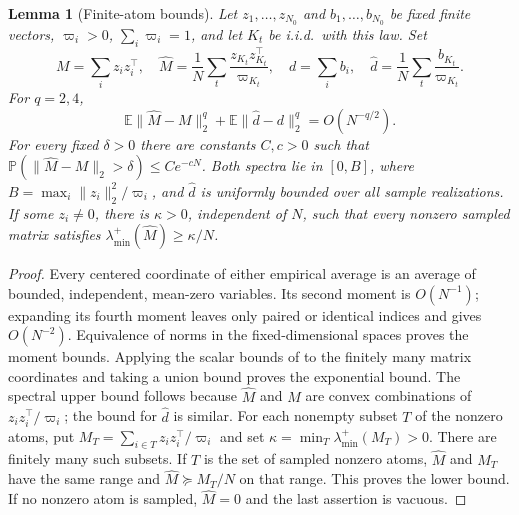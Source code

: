 \documentclass[11pt,a4paper,leqno]{article}
\numberwithin{equation}{section}
\numberwithin{figure}{section}
\numberwithin{table}{section}
\theoremstyle{plain}
\newtheorem{lemma}{Lemma}[section]
\theoremstyle{definition}
\theoremstyle{remark}
\newcommand{\E}{\mathbb E}
\newcommand{\Prob}{\mathbb P}
\begin{document}
\begin{lemma}[Finite-atom bounds]\label{lem:finite_atoms}
Let $z_1,\ldots,z_{N_0}$ and $b_1,\ldots,b_{N_0}$ be fixed finite vectors,
$\varpi_i>0$, $\sum_i\varpi_i=1$, and let $K_t$ be i.i.d.\ with this law.
Set
\[
 M=\sum_i z_i z_i^\top,\quad
 \widehat M=\frac1N\sum_t\frac{z_{K_t}z_{K_t}^\top}{\varpi_{K_t}},
 \quad d=\sum_i b_i,\quad
 \widehat d=\frac1N\sum_t\frac{b_{K_t}}{\varpi_{K_t}}.
\]
For $q=2,4$,
\[
 \E\|\widehat M-M\|_2^q+\E\|\widehat d-d\|_2^q=O(N^{-q/2}).
\]
For every fixed $\delta>0$ there are constants $C,c>0$ such that
$\Prob(\|\widehat M-M\|_2>\delta)\le Ce^{-cN}$.
Both spectra lie in $[0,B]$, where $B=\max_i\|z_i\|_2^2/\varpi_i$,
and $\widehat d$ is uniformly bounded over all sample realizations.
If some $z_i\ne0$, there is $\kappa>0$, independent of $N$, such that
every nonzero sampled matrix satisfies
$\lambda_{\min}^+(\widehat M)\ge\kappa/N$.
\end{lemma}
\begin{proof}
Every centered coordinate of either empirical average is an average of
bounded, independent, mean-zero variables. Its second moment is $O(N^{-1})$;
expanding its fourth moment leaves only paired or identical indices and
gives $O(N^{-2})$. Equivalence of norms in the fixed-dimensional spaces
proves the moment bounds. Applying the scalar bounds of
\citet{hoeffding1963probability} to the finitely
many matrix coordinates and taking a union bound proves the exponential bound.
The spectral upper bound follows because $\widehat M$ and $M$ are convex
combinations of $z_i z_i^\top/\varpi_i$; the bound for $\widehat d$ is similar.
For each nonempty subset $T$ of the nonzero atoms, put
$M_T=\sum_{i\in T}z_i z_i^\top/\varpi_i$ and set
$\kappa=\min_T\lambda_{\min}^+(M_T)>0$.
There are finitely many such subsets. If $T$ is the set of sampled nonzero
atoms, $\widehat M$ and $M_T$ have the same range and
$\widehat M\succeq M_T/N$ on that range. This proves the lower bound.
If no nonzero atom is sampled, $\widehat M=0$ and the last assertion is vacuous.
\end{proof}
\end{document}
